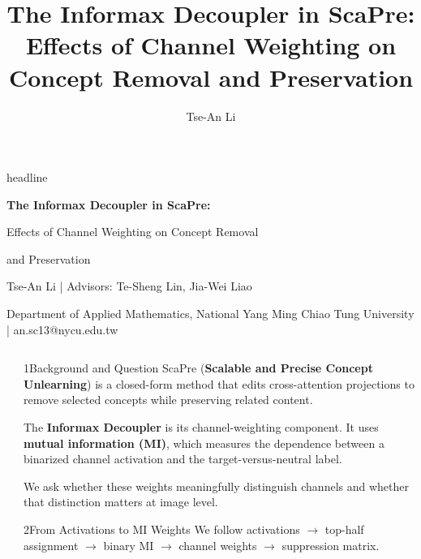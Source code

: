 \documentclass[final]{beamer}
\title{The Informax Decoupler in ScaPre: Effects of Channel Weighting on Concept Removal and Preservation}
\author{Tse-An Li}
\institute{Department of Applied Mathematics, National Yang Ming Chiao Tung University}
\newlength{\sepwidth}
\newlength{\colwidth}
\newcommand{\separatorcolumn}{\begin{column}{\sepwidth}\end{column}}
\newcommand{\blocktext}{\RaggedRight\setlength{\parindent}{0pt}\noindent}
\begin{document}
\begin{frame}[t]

\begin{beamercolorbox}[wd=\paperwidth,sep=1.15cm,leftskip=0.8cm,rightskip=0.8cm]{headline}
{\color{white}\bfseries\fontsize{49}{54}\selectfont
The Informax Decoupler in ScaPre:\par
Effects of Channel Weighting on Concept Removal\par
and Preservation\par}
\vspace{0.45cm}
{\color{white}\fontsize{28}{33}\selectfont
Tse-An Li \quad | \quad Advisors: Te-Sheng Lin, Jia-Wei Liao\par}
{\color{white}\fontsize{22}{27}\selectfont
Department of Applied Mathematics, National Yang Ming Chiao Tung University
\quad | \quad an.sc13@nycu.edu.tw\par}
\end{beamercolorbox}

\vspace{0.45cm}
\begin{columns}[t,totalwidth=\paperwidth]

\separatorcolumn
\begin{column}{\colwidth}

\begin{block}{1\quad Background and Question}
\blocktext
ScaPre (\textbf{Scalable and Precise Concept Unlearning}) is a closed-form method that edits cross-attention projections to remove selected concepts while preserving related content.

The \textbf{Informax Decoupler} is its channel-weighting component. It uses \textbf{mutual information (MI)}, which measures the dependence between a binarized channel activation and the target-versus-neutral label.

We ask whether these weights meaningfully distinguish channels and whether that distinction matters at image level.
\end{block}

\begin{block}{2\quad From Activations to MI Weights}
\blocktext
We follow activations $\rightarrow$ top-half assignment $\rightarrow$ binary MI $\rightarrow$ channel weights $\rightarrow$ suppression matrix.


\end{block}
\end{column}
\end{columns}
\end{frame}
\end{document}
